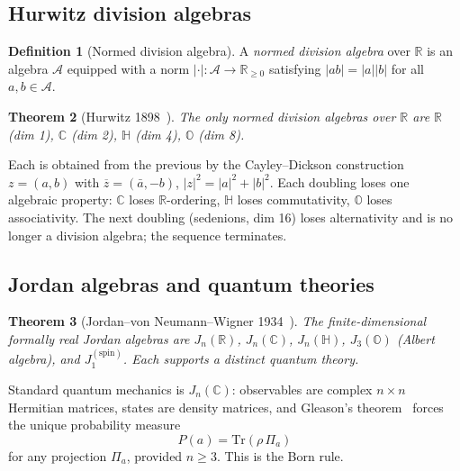 \documentclass[11pt,a4paper]{article}
\newtheorem{theorem}{Theorem}[section]
\theoremstyle{definition}
\newtheorem{definition}[theorem]{Definition}
\theoremstyle{remark}
\newcommand{\CC}{\mathbb{C}}
\newcommand{\HH}{\mathbb{H}}
\newcommand{\OO}{\mathbb{O}}
\newcommand{\RR}{\mathbb{R}}
\begin{document}
\subsection{Hurwitz division algebras}
 
\begin{definition}[Normed division algebra]
\label{P9:def:normed_division_algebra}
A \emph{normed division algebra} over $\RR$ is an algebra $\mathcal{A}$
equipped with a norm $|\cdot|:\mathcal{A}\to\RR_{\geq0}$ satisfying
$|ab|=|a||b|$ for all $a,b\in\mathcal{A}$.
\end{definition}
 
\begin{theorem}[Hurwitz 1898~\cite{Hurwitz1898}]
\label{P9:thm:hurwitz}
The only normed division algebras over $\RR$ are
$\RR$ (dim 1), $\CC$ (dim 2), $\HH$ (dim 4), $\OO$ (dim 8).
\end{theorem}
 
Each is obtained from the previous by the Cayley--Dickson construction
$z=(a,b)$ with $\overline{z}=(\bar{a},-b)$, $|z|^2=|a|^2+|b|^2$.
Each doubling loses one algebraic property: $\CC$ loses $\RR$-ordering,
$\HH$ loses commutativity, $\OO$ loses associativity.
The next doubling (sedenions, dim 16) loses alternativity and is no longer
a division algebra; the sequence terminates.
 
\subsection{Jordan algebras and quantum theories}
 
\begin{theorem}[Jordan--von Neumann--Wigner 1934~\cite{JordanNeumannWigner1934}]
\label{P9:thm:jnw}
The finite-dimensional formally real Jordan algebras are
$J_n(\RR)$, $J_n(\CC)$, $J_n(\HH)$, $J_3(\OO)$ (Albert algebra),
and $J_1^{(\mathrm{spin})}$.
Each supports a distinct quantum theory.
\end{theorem}
 
Standard quantum mechanics is $J_n(\CC)$: observables are complex
$n\times n$ Hermitian matrices, states are density matrices, and
Gleason's theorem~\cite{Gleason1957} forces the unique probability measure
\begin{equation}
  P(a) = \mathrm{Tr}(\rho\, \Pi_a)
  \label{P9:eq:born_standard}
\end{equation}
for any projection $\Pi_a$, provided $n\geq 3$.
This is the Born rule.
 
\end{document}
